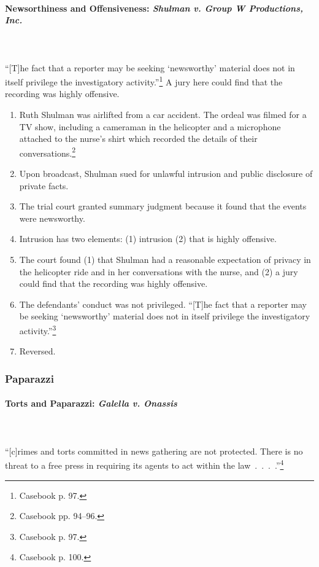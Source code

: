 \paragraph{Newsorthiness and Offensiveness: \emph{Shulman v. Group W 
Productions, Inc.}}
~\\\\
``[T]he fact that a reporter may be seeking `newsworthy' material does not in 
itself privilege the investigatory activity.''\footnote{Casebook p. 97.} A jury 
here could find that the recording was highly offensive.

\begin{enumerate}
    \item Ruth Shulman was airlifted from a car accident. The ordeal was filmed 
    for a TV show, including a cameraman in the helicopter and a microphone 
    attached to the nurse's shirt which recorded the details of their 
    conversations.\footnote{Casebook pp. 94--96.}
    \item Upon broadcast, Shulman sued for unlawful intrusion and public 
    disclosure of private facts.
    \item The trial court granted summary judgment because it found that the 
    events were newsworthy.
    \item Intrusion has two elements: (1) intrusion (2) that is highly 
    offensive.
    \item The court found (1) that Shulman had a reasonable expectation of 
    privacy in the helicopter ride and in her conversations with the nurse, and 
    (2) a jury could find that the recording was highly offensive.
    \item The defendants' conduct was not privileged. ``[T]he fact that a 
    reporter may be seeking `newsworthy' material does not in itself privilege 
    the investigatory activity.''\footnote{Casebook p. 97.}
    \item Reversed.
\end{enumerate}

\subsubsection{Paparazzi}

\paragraph{Torts and Paparazzi: \emph{Galella v. Onassis}}
~\\\\
``[c]rimes and torts committed in news gathering are not protected. There is no 
threat to a free press in requiring its agents to act within the 
law~.~.~.~.''\footnote{Casebook p. 100.}

